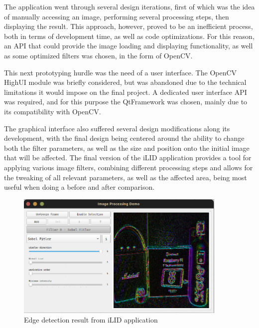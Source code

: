 The application went through several design iterations, first of which was the idea of manually accessing an
image, performing several processing steps, then displaying the result. This approach, however, proved to be an 
inefficient process, both in terms of development time, as well as code optimizations. For this reason, an API
that could provide the image loading and displaying functionality, as well as some optimized filters was chosen,
in the form of OpenCV.

This next prototyping hurdle was the need of a user interface. The OpenCV HighUI module was briefly considered,
but was abandoned due to the technical limitations it would impose on the final project. A dedicated user
interface API was required, and for this purpose the QtFramework was chosen, mainly due to its compatibility
with OpenCV.

The graphical interface also suffered several design modifications along its development, with the final design
being centered around the ability to change both the filter parameters, as well as the size and position onto
the initial image that will be affected. The final version of the iLID application provides a tool for applying various
image filters, combining different processing steps and allows for the tweaking of all relevant parameters, as
well as the affected area, being most useful when doing a before and after comparison.

\begin{figure}[H]
	\includegraphics[width=0.9\textwidth, height=0.6\textwidth]{resources/Sobel_5.png}
	\caption{Edge detection result from iLID application}
\end{figure}

